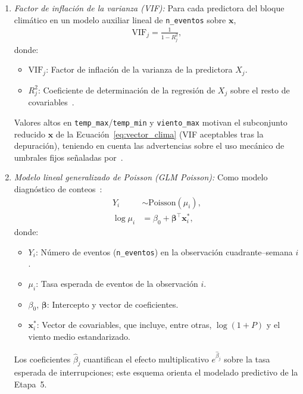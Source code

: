 \begin{enumerate}
    \item \textit{Factor de inflación de la varianza (VIF):}
    Para cada predictora del bloque climático en un modelo auxiliar lineal de \texttt{n\_eventos} sobre $\mathbf{x}$,
    \begin{equation}
        \begin{aligned}
        \mathrm{VIF}_j = \frac{1}{1 - R_j^{2}},
        \end{aligned}
        \label{eq:vif}
    \end{equation}
    donde:
    \begin{itemize}
        \item $\mathrm{VIF}_j$: Factor de inflación de la varianza de la predictora $X_j$.
        \item $R_j^{2}$: Coeficiente de determinación de la regresión de $X_j$ sobre el resto de covariables~\cite{ref61}.
    \end{itemize}
    Valores altos en \texttt{temp\_max}/\texttt{temp\_min} y \texttt{viento\_max} motivan el subconjunto reducido $\mathbf{x}$ de la Ecuación~\eqref{eq:vector_clima} (VIF aceptables tras la depuración), teniendo en cuenta las advertencias sobre el uso mecánico de umbrales fijos señaladas por~\cite{ref62}.

    \item \textit{Modelo lineal generalizado de Poisson (GLM Poisson):}
    Como modelo diagnóstico de conteos~\cite{ref63,ref64}:
    \begin{equation}
        \begin{aligned}
        Y_i &\sim \mathrm{Poisson}(\mu_i), \\
        \log \mu_i &= \beta_0 + \boldsymbol{\beta}^{\top}\mathbf{x}_i^{\ast},
        \end{aligned}
        \label{eq:glm_poisson}
    \end{equation}
    donde:
    \begin{itemize}
        \item $Y_i$: Número de eventos (\texttt{n\_eventos}) en la observación cuadrante--semana $i$.
        \item $\mu_i$: Tasa esperada de eventos de la observación $i$.
        \item $\beta_0$, $\boldsymbol{\beta}$: Intercepto y vector de coeficientes.
        \item $\mathbf{x}_i^{\ast}$: Vector de covariables, que incluye, entre otras, $\log(1+P)$ y el viento medio estandarizado.
    \end{itemize}
    Los coeficientes $\hat{\beta}_j$ cuantifican el efecto multiplicativo $e^{\hat{\beta}_j}$ sobre la tasa esperada de interrupciones; este esquema orienta el modelado predictivo de la Etapa~5.
\end{enumerate}


